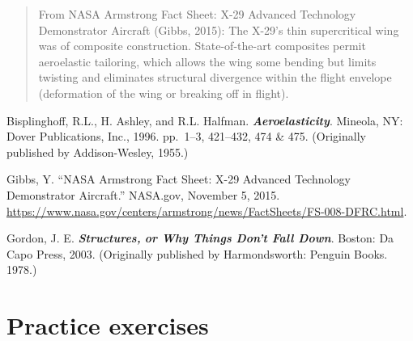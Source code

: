 \documentclass{AeroStructure-ERJohnson}
\begin{document}
\begin{quote}
From NASA Armstrong Fact Sheet: X-29 Advanced Technology Demonstrator Aircraft (Gibbs, 2015): The X-29's thin supercritical wing was of composite construction. State-of-the-art composites permit aeroelastic tailoring, which allows the wing some bending but limits twisting and eliminates structural divergence within the flight envelope (deformation of the wing or breaking off in flight).
\end{quote}

{\def\thefigure{12.9}
}

\def\rightmark{Practice exercises}

\begin{thebibliography}{}\label{sec12.5}
\bibitem{}
Bisplinghoff, R.L., H. Ashley, and R.L. Halfman. \textit{\textbf{Aeroelasticity}}. Mineola, NY: Dover Publications, Inc., 1996. pp.~1--3, 421--432, 474 \& 475. (Originally published by Addison-Wesley, 1955.)

\bibitem{}
Gibbs, Y. ``NASA Armstrong Fact Sheet: X-29 Advanced Technology Demonstrator Aircraft.'' NASA.gov, November 5, 2015. \url{https://www.nasa.gov/centers/armstrong/news/FactSheets/FS-008-DFRC.html}.

\bibitem{}
Gordon, J. E. \textit{\textbf{Structures,} \textbf{or Why Things Don't Fall Down}}. Boston: Da Capo Press, 2003. (Originally published by Harmondsworth: Penguin Books. 1978.)
\end{thebibliography}

\section{Practice exercises}\label{sec12.6}
\end{document}
